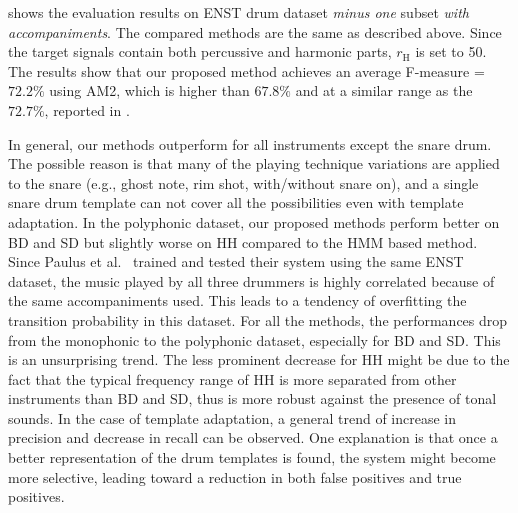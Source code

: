 \documentclass{article}
\begin{document}
 shows the evaluation results on ENST drum dataset \textit{minus one} subset \textit{with accompaniments}. The compared methods are the same as described above. Since the target signals contain both percussive and harmonic parts, $r_\mathrm{H}$ is set to 50. The results show that our proposed method achieves an average F-measure = $72.2\%$ using AM2, which is higher than $67.8\%$ \cite{gillet_transcription_2008} and at a similar range as the $72.7\%$, reported in \cite{Paulus2009a}. %

In general, our methods outperform \cite{gillet_transcription_2008} for all instruments except the snare drum. The possible reason is that many of the playing technique variations are applied to the snare (e.g., ghost note, rim shot, with/without snare on), and a single snare drum template can not cover all the possibilities even with template adaptation. In the polyphonic dataset, our proposed methods perform better on BD and SD but slightly worse on HH compared to the HMM based method\cite{Paulus2009a}. Since Paulus et al.\ \cite{Paulus2009a} trained and tested their system using the same ENST dataset, the music played by all three drummers is highly correlated because of the same accompaniments used. This leads to a tendency of overfitting the transition probability in this dataset.
For all the methods, the performances drop from the monophonic to the polyphonic dataset, especially for BD and SD. This is an unsurprising trend. The less prominent decrease for HH might be due to the fact that the typical frequency range of HH is more separated from other instruments than BD and SD, thus is more robust against the presence of tonal sounds. In the case of template adaptation, a general trend of increase in precision and decrease in recall can be observed. One explanation is that once a better representation of the drum templates is found, the system might become more selective, leading toward a reduction in both false positives and true positives. 
\end{document}
